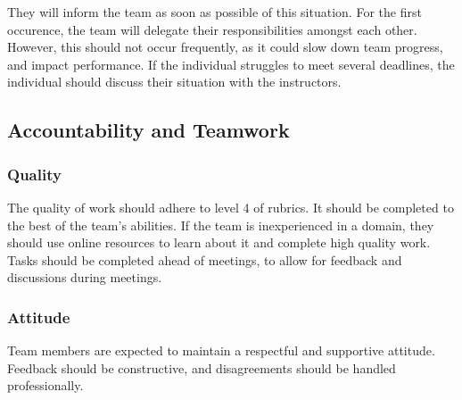 \documentclass{article}
\begin{document}
\begin{comment}
\wss{What process will team members follow if they have an emergency and cannot
attend a team meeting or complete their individual work promised for a team
deliverable?}
\end{comment}
They will inform the team as soon as possible of this situation. For the first occurence, the team will delegate their responsibilities amongst each other. However, this should not occur frequently, as it could slow down team progress, and impact performance. If the individual struggles to meet several deadlines, the individual should discuss their situation with the instructors.

\subsection*{Accountability and Teamwork}

\subsubsection*{Quality} 

\begin{comment}
\wss{What are your team's expectations regarding the quality
of team members' preparation for team meetings and the quality of the
deliverables that members bring to the team?}
\end{comment}

The quality of work should adhere to level 4 of rubrics. It should be completed to the best of the team's abilities. If the team is inexperienced in a domain, they should use online resources to learn about it and complete high quality work. Tasks should be completed ahead of meetings, to allow for feedback and discussions during meetings.
\subsubsection*{Attitude}
Team members are expected to maintain a respectful and supportive attitude. Feedback should be constructive, and disagreements should be handled professionally.

\begin{comment}
\wss{What are your team's expectations regarding team members' ideas,
interactions with the team, cooperation, attitudes, and anything else regarding
team member contributions?  Do you want to introduce a code of conduct?  Do you
want a conflict resolution plan?  Can adopt existing codes of conduct.}
\end{comment}
\end{document}

